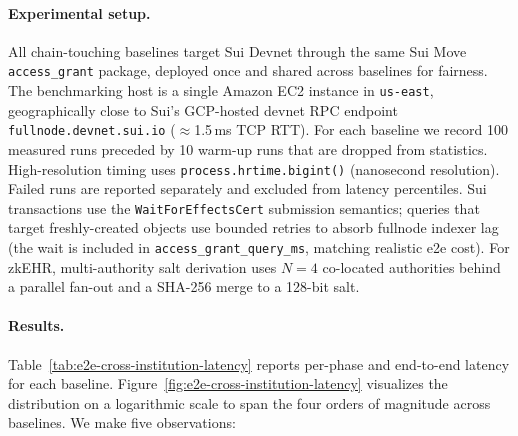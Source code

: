 \paragraph{Experimental setup.}
All chain-touching baselines target Sui Devnet through the same Sui
Move \texttt{access\_grant} package, deployed once and shared across
baselines for fairness. The benchmarking host is a single Amazon EC2
instance in \texttt{us\nobreakdash-east}, geographically
close to Sui's GCP-hosted devnet RPC endpoint
\texttt{fullnode.devnet.sui.io} ($\approx$1.5\,ms TCP RTT). For each
baseline we record 100 measured runs preceded by 10 warm-up runs that
are dropped from statistics. High-resolution timing uses
\texttt{process.hrtime.bigint()} (nanosecond resolution). Failed runs
are reported separately and excluded from latency percentiles. Sui
transactions use the \texttt{WaitForEffectsCert} submission semantics;
queries that target freshly-created objects use bounded retries to
absorb fullnode indexer lag (the wait is included in
\texttt{access\_grant\_query\_ms}, matching realistic e2e cost). For
zkEHR, multi-authority salt derivation uses $N{=}4$ co-located
authorities behind a parallel fan-out and a SHA-256 merge to a 128-bit
salt.

\paragraph{Results.}
Table~\ref{tab:e2e-cross-institution-latency} reports per-phase and
end-to-end latency for each baseline.
Figure~\ref{fig:e2e-cross-institution-latency} visualizes the
distribution on a logarithmic scale to span the four orders of
magnitude across baselines. We make five observations:

